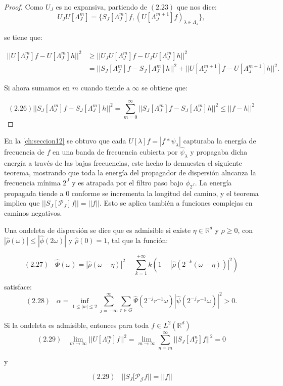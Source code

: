 \begin{proof}
Como $U_J$ es no expansiva, partiendo de $(2.23)$ que nos dice: 
$$U_J U[\Lambda_J^m]=\lbrace S_J[\Lambda_J^m]f,(U[\Lambda_J^{m+1}]f)_{\lambda\in\Lambda_J}\rbrace,$$

se tiene que:

\begin{align*}
    ||U[\Lambda_J^m]f-U[\Lambda_J^m]h||^2 &\geq ||U_J U[\Lambda_J^m]f-U_J U[\Lambda_J^m]h||^2 \\
    & = ||S_J[\Lambda_J^m]f - S_J[\Lambda_J^m]h||^2 + ||U[\Lambda_J^{m+1}]f-U[\Lambda_J^{m+1}]h||^2.
\end{align*}

\medskip

\noindent Si ahora sumamos en $m$ cuando tiende a $\infty$ se obtiene que: 

$$(2.26) ||S_J[\Lambda_J^m]f - S_J[\Lambda_J^m]h||^2=\sum_{m=0}^{\infty} ||S_J[\Lambda_J^m]f - S_J[\Lambda_J^m]h||^2 \leq ||f-h||^2$$ \qedhere
\end{proof}

En la \autoref{ch:seccion12} se obtuvo que cada $U[\lambda]f=|f \ast \psi_\lambda|$ capturaba la energía de frecuencia de $f$ en una banda de frecuencia cubierta por $\widehat{\psi}_\lambda$ y propagaba dicha energía a través de las bajas frecuencias, este hecho lo demuestra el siguiente teorema, mostrando que toda la energía del propagador de dispersión alncanza la frecuencia mínima $2^J$ y es atrapada por el filtro paso bajo $\phi_ {2^J}$. La energía propagada tiende a $0$ conforme se incrementa la longitud del camino, y el teorema implica que $||S_J[\mathcal{P}_J]f||=||f||$. Esto se aplica también a funciones complejas en caminos negativos.

\begin{teorema} \label{teoremaOndeletasAdmisibles}
Una ondeleta de dispersión se dice que es admisible si existe $\eta \in \mathbb{R}^d$ y $\rho \geq 0$, con $|\widehat{\rho}(\omega)| \leq |\widehat{\phi}(2\omega)|$ y $\widehat{\rho}(0)=1$, tal que la función: 

$$(2.27) \;\;\; \widehat{\Phi}(\omega)=|\widehat{\rho}(\omega - \eta)|^2 - \sum_{k=1}^{+\infty} k(1-|\widehat{\rho}(2^{-k}(\omega - \eta))|^2)$$

\noindent satisface: 
$$(2.28) \;\;\; \alpha= \inf_{1\leq|w|\leq2} \sum_{j=-\infty}^{\infty} \sum_{r\in G} \widehat{\Psi} (2^{-j}r^{-1}\omega)|\widehat{\psi}(2^{-j}r^{-1}\omega)|^2>0.$$

\noindent Si la ondeleta es admisible, entonces para toda $f\in L^2(\mathbb{R}^d)$
$$(2.29) \;\;\; \lim_{m\rightarrow\infty} ||U[\Lambda_J^m]f||^2=\lim_{m\rightarrow\infty} \sum_{n=m}^{\infty} ||S_J[\Lambda_J^n]f||^2=0$$

y

$$(2.29) \;\;\; ||S_J[\mathcal{P_J}f||=||f||$$
\end{teorema}

